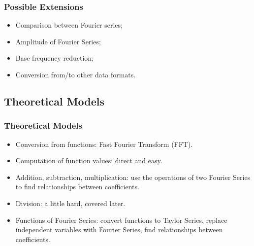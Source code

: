 \documentclass{beamer}
\begin{document}
	\begin{frame}
		\frametitle{Possible Extensions}
		\begin{itemize}
			\item Comparison between Fourier series;
			\item Amplitude of Fourier Series;
			\item Base frequency reduction;
			\item Conversion from/to other data formats.
	\end{itemize}
	\end{frame}

	\subsection{Theoretical Models}
	\begin{frame}
		\frametitle{Theoretical Models}
		\begin{itemize}
		\item Conversion from functions: Fast Fourier Transform (FFT).
\item Computation of function values: direct and easy.
\item Addition, subtraction, multiplication: use the operations of two Fourier Series to find relationships between coefficients.
\item Division: a little hard, covered later.
\item Functions of Fourier Series: convert functions to Taylor Series, replace independent variables with Fourier Series, find relationships between coefficients.
		\end{itemize}
	\end{frame}
\end{document}
